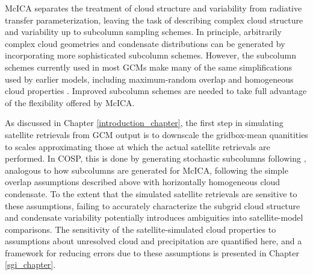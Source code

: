 McICA separates the treatment of cloud structure and variability from radiative transfer parameterization, leaving the task of describing complex cloud structure and variability up to subcolumn sampling schemes. In principle, arbitrarily complex cloud geometries and condensate distributions can be generated by incorporating more sophisticated subcolumn schemes. However, the subcolumn schemes currently used in most GCMs make many of the same simplifications used by earlier models, including maximum-random overlap and homogeneous cloud properties \citep[e.g.,][]{neale_et_al_2010a, neale_et_al_2010b}. Improved subcolumn schemes are needed to take full advantage of the flexibility offered by McICA.

As discussed in Chapter \ref{introduction_chapter}, the first step in simulating satellite retrievals from GCM output is to downscale the gridbox-mean quanitities to scales approximating those at which the actual satellite retrievals are performed. In COSP, this is done by generating stochastic subcolumns following \cite{klein_and_jakob_1999}, analogous to how subcolumns are generated for McICA, following the simple overlap assumptions described above with horizontally homogeneous cloud condensate. To the extent that the simulated satellite retrievals are sensitive to these assumptions, failing to accurately characterize the subgrid cloud structure and condensate variability potentially introduces ambiguities into satellite-model comparisons. The sensitivity of the satellite-simulated cloud properties to assumptions about unresolved cloud and precipitation are quantified here, and a framework for reducing errors due to these assumptions is presented in Chapter \ref{sgi_chapter}.


